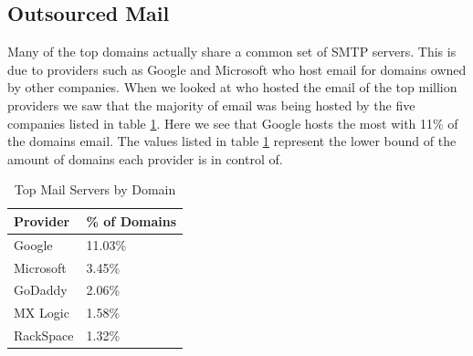 \subsection{Outsourced Mail}
Many of the top domains actually share a common set of SMTP servers. This is due 
to providers such as Google and Microsoft who host email for domains owned by 
other companies. When we looked at who hosted the email of the top million 
providers we saw that the majority of email was being hosted by the five 
companies listed in table \ref{table:top_servers}. Here we see that Google hosts 
the most with 11\% of the domains email. The values listed in table 
\ref{table:top_servers} represent the lower bound of the amount of domains each 
provider is in control of.

\begin{table}
    \caption{Top Mail Servers by Domain}
    \centering
    \label{table:top_servers}
    \begin{tabular}{|l|l|}
        \hline
        Provider & \% of Domains \\
        \hline
        Google & 11.03\% \\
        Microsoft & 3.45\% \\ 
        GoDaddy & 2.06\% \\
        MX Logic & 1.58\% \\
        RackSpace & 1.32\% \\
        \hline
    \end{tabular}
\end{table}

